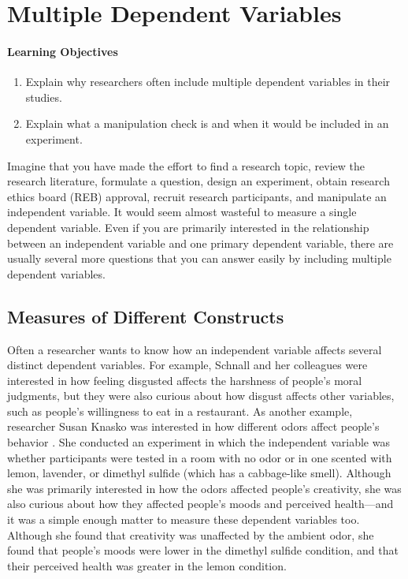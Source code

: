 \section{Multiple Dependent Variables}

  \paragraph{Learning Objectives}
  \begin{enumerate}
  \item Explain why researchers often include multiple dependent variables in their studies.
  \item Explain what a manipulation check is and when it would be included in an experiment.

   \end{enumerate}


Imagine that you have made the effort to find a research topic, review the research literature, formulate a question, design an experiment, obtain research ethics board (REB) approval, recruit research participants, and manipulate an independent variable. It would seem almost wasteful to measure a single dependent variable. Even if you are primarily interested in the relationship between an independent variable and one primary dependent variable, there are usually several more questions that you can answer easily by including multiple dependent variables.

\subsection{Measures of Different Constructs}

Often a researcher wants to know how an independent variable affects several distinct dependent variables. For example, Schnall and her colleagues were interested in how feeling disgusted affects the harshness of people's moral judgments, but they were also curious about how disgust affects other variables, such as people's willingness to eat in a restaurant. As another example, researcher Susan Knasko was interested in how different odors affect people's behavior \citep{knasko_ambient_1992}. She conducted an experiment in which the independent variable was whether participants were tested in a room with no odor or in one scented with lemon, lavender, or dimethyl sulfide (which has a cabbage-like smell). Although she was primarily interested in how the odors affected people's creativity, she was also curious about how they affected people's moods and perceived health---and it was a simple enough matter to measure these dependent variables too. Although she found that creativity was unaffected by the ambient odor, she found that people's moods were lower in the dimethyl sulfide condition, and that their perceived health was greater in the lemon condition.


